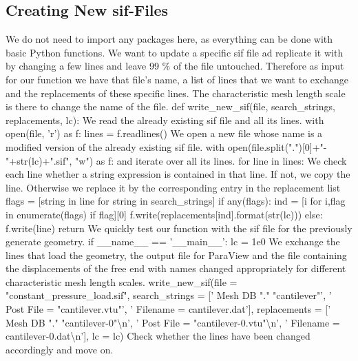 \subsection*{Creating New sif-Files}
We do not need to import any packages here, as everything can be done with basic Python functions. We want to update a specific sif file ad replicate it with by changing a few lines and leave 99 \% of the file untouched. Therefore as input for our function we have that file's name, a list of lines that we want to exchange and the replacements of these specific lines. The characteristic mesh length scale is there to change the name of the file. 
\ttbegin
def write_new_sif(file, 
                  search_strings, 
                  replacements,
                  lc):
\ttend 
We read the already existing sif file and all its lines. 
\ttbegin
    with open(file, 'r') as f:
        lines = f.readlines()
\ttend 
We open a new file whose name is a modified version of the already existing sif file.
\ttbegin
   with open(file.split(".")[0]+"-"+str(lc)+".sif", "w") as f:
\ttend
and iterate over all its lines.
\ttbegin
      for line in lines:
\ttend
We check each line whether a string expression is contained in that line. If not, we copy the line. Otherwise we replace it by the corresponding entry in the replacement list
\ttbegin
          flags = [string in line for string in search_strings]
          if any(flags):
             ind = [i for i,flag in enumerate(flags) if flag][0]
             f.write(replacements[ind].format(str(lc)))
          else:
             f.write(line)
    return
\ttend
We quickly test our function with the sif file for the previously generate geometry. 
\ttbegin
if __name__ == '__main__':
    lc = 1e0
\ttend
We exchange the lines that load the geometry, the output file for ParaView and the file containing the displacements of the free end with names changed appropriately for different characteristic mesh length scales.
\ttbegin 
    write_new_sif(file = "constant_pressure_load.sif", 
                  search_strings = ['  Mesh DB "." "cantilever"',
                                    '  Post File = "cantilever.vtu"',
                                    '  Filename = cantilever.dat'], 
                  replacements = ['  Mesh DB "." "cantilever-{0}"\textbackslash n',
                             '  Post File = "cantilever-{0}.vtu"\textbackslash n',
                             '  Filename = cantilever-{0}.dat\textbackslash n'],
                  lc = lc)
\ttend
Check whether the lines have been changed accordingly and move on.
